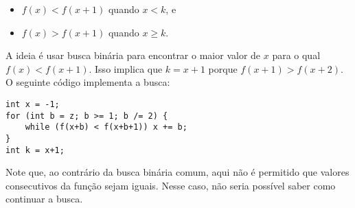 \begin{itemize}
\item
$f(x)<f(x+1)$ quando $x<k$, e
\item
$f(x)>f(x+1)$ quando $x \ge k$.
\end{itemize}

A ideia é usar busca binária para encontrar o maior valor de $x$
para o qual $f(x)<f(x+1)$.
Isso implica que $k=x+1$
porque $f(x+1)>f(x+2)$.
O seguinte código implementa a busca: 

\begin{lstlisting}
int x = -1;
for (int b = z; b >= 1; b /= 2) {
    while (f(x+b) < f(x+b+1)) x += b;
}
int k = x+1;
\end{lstlisting}

Note que, ao contrário da busca binária comum, aqui não é permitido que valores consecutivos da função sejam iguais. Nesse caso, não seria possível saber como continuar a busca.
